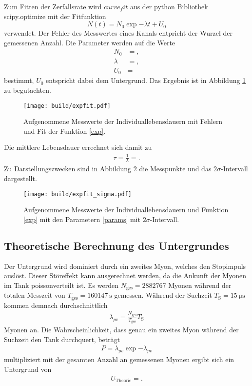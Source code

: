 Zum Fitten der Zerfallsrate wird $curve_fit$ aus der python Bibliothek scipy.optimize mit der Fitfunktion
\begin{equation}
  N(t) = N_0 \exp{-\lambda t} + U_0 \label{exp}
\end{equation}
verwendet.
Der Fehler des Messwertes eines Kanals entpricht der Wurzel der gemessenen Anzahl. %
Die Parameter werden auf die Werte \label{params}
\begin{align*}
  N_0 &= ,\\
  \lambda &= ,\\
  U_0 &= 
\end{align*}
bestimmt, $U_0$ entspricht dabei dem Untergrund.
Das Ergebnis ist in Abbildung \ref{plot:punkte_err_fit} zu begutachten.
\begin{figure}
  \centering
  \texttt{[image: build/expfit.pdf]}
  \caption{Aufgenommene Messwerte der Individuallebensdauern mit Fehlern und Fit der Funktion \ref{exp}.}
  \label{plot:punkte_err_fit}
\end{figure}
Die mittlere Lebensdauer errechnet sich damit zu
\begin{align*}
  \tau = \frac{1}{\lambda} = .
\end{align*}
Zu Darstellungszwecken sind in Abbildung \ref{plot:punkte_sigma} die Messpunkte und das $2\sigma$-Intervall dargestellt.
\begin{figure}
  \centering
  \texttt{[image: build/expfit\_sigma.pdf]}
  \caption{Aufgenommene Messwerte der Individuallebensdauern und Funktion \ref{exp} mit den Parametern \ref{params} mit $2\sigma$-Intervall.}
  \label{plot:punkte_sigma}
\end{figure}


\subsection{Theoretische Berechnung des Untergrundes}

Der Untergrund wird dominiert durch ein zweites Myon, welches den Stopimpuls auslöst.
Dieser Störeffekt kann ausgerechnet werden, da die Ankunft der Myonen im Tank poissonverteilt ist.
Es werden $N_\text{ges} = \num{2882767}$ Myonen während der totalen Messzeit von $T_\text{ges} = \SI{160147}{\second}$ gemessen.
Während der Suchzeit $T_\text{S} = \SI{15}{\micro\second}$ kommen demnach durchschnittlich
\begin{align*}
  \lambda_{pv} = \frac{N_\text{ges}}{T_\text{ges}} T_\text{S}
\end{align*}
Myonen an.
Die Wahrscheinlichkeit, dass genau ein zweites Myon während der Suchzeit den Tank durchquert, beträgt
\begin{align*}
  P = \lambda_{pv} \exp{-\lambda_{pv}}
\end{align*}
multipliziert mit der gesamten Anzahl an gemessenen Myonen ergibt sich ein Untergrund von
\begin{align*}
  U_{\text{Theorie}} = .
\end{align*}
